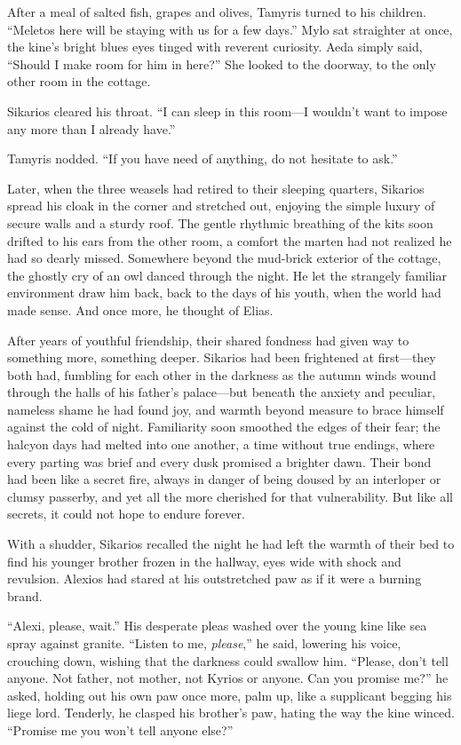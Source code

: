 After a meal of salted fish, grapes and olives, Tamyris turned to his children. ``Meletos here will be staying with us for a few days.'' Mylo sat straighter at once, the kine's bright blues eyes tinged with reverent curiosity. Aeda simply said, ``Should I make room for him in here?'' She looked to the doorway, to the only other room in the cottage.

Sikarios cleared his throat. ``I can sleep in this room---I wouldn't want to impose any more than I already have.''

Tamyris nodded. ``If you have need of anything, do not hesitate to ask.''

Later, when the three weasels had retired to their sleeping quarters, Sikarios spread his cloak in the corner and stretched out, enjoying the simple luxury of secure walls and a sturdy roof. The gentle rhythmic breathing of the kits soon drifted to his ears from the other room, a comfort the marten had not realized he had so dearly missed. Somewhere beyond the mud-brick exterior of the cottage, the ghostly cry of an owl danced through the night. He let the strangely familiar environment draw him back, back to the days of his youth, when the world had made sense. And once more, he thought of Elias.

After years of youthful friendship, their shared fondness had given way to something more, something deeper. Sikarios had been frightened at first---they both had, fumbling for each other in the darkness as the autumn winds wound through the halls of his father's palace---but beneath the anxiety and peculiar, nameless shame he had found joy, and warmth beyond measure to brace himself against the cold of night. Familiarity soon smoothed the edges of their fear; the halcyon days had melted into one another, a time without true endings, where every parting was brief and every dusk promised a brighter dawn. Their bond had been like a secret fire, always in danger of being doused by an interloper or clumsy passerby, and yet all the more cherished for that vulnerability. But like all secrets, it could not hope to endure forever.

With a shudder, Sikarios recalled the night he had left the warmth of their bed to find his younger brother frozen in the hallway, eyes wide with shock and revulsion. Alexios had stared at his outstretched paw as if it were a burning brand.

``Alexi, please, wait.'' His desperate pleas washed over the young kine like sea spray against granite. ``Listen to me, \emph{please},'' he said, lowering his voice, crouching down, wishing that the darkness could swallow him. ``Please, don't tell anyone. Not father, not mother, not Kyrios or anyone. Can you promise me?'' he asked, holding out his own paw once more, palm up, like a supplicant begging his liege lord. Tenderly, he clasped his brother's paw, hating the way the kine winced. ``Promise me you won't tell anyone else?''

